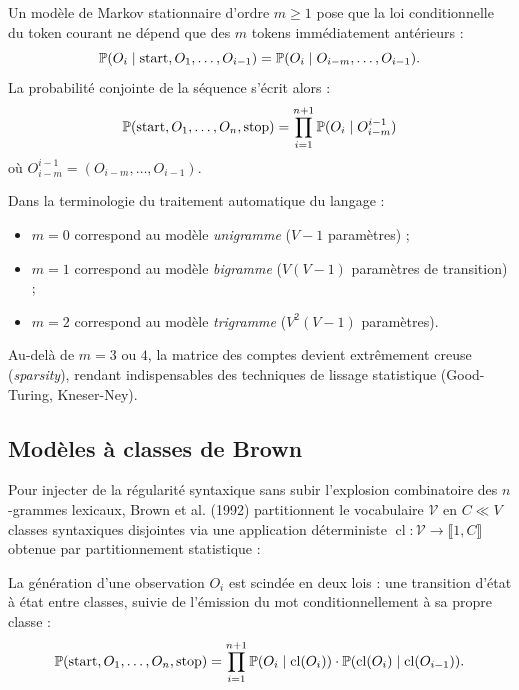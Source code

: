 \begin{definition}
    Un modèle de Markov stationnaire d'ordre $m \geqslant 1$ pose que la loi conditionnelle du token courant ne dépend que des $m$ tokens immédiatement antérieurs :
    \begin{equation}
        \mathbb{P}(O_i \mid \operatorname{start}, O_1, \dots, O_{i-1}) = \mathbb{P}(O_i \mid O_{i-m}, \dots, O_{i-1}).
    \end{equation}
    La probabilité conjointe de la séquence s'écrit alors :
    \begin{equation}
        \mathbb{P}(\operatorname{start}, O_1, \dots, O_n, \operatorname{stop}) = \prod_{i=1}^{n+1} \mathbb{P}(O_i \mid O_{i-m}^{i-1})
    \end{equation}
    où $O_{i-m}^{i-1} = (O_{i-m}, \dots, O_{i-1})$.
\end{definition}

\begin{remark}
    Dans la terminologie du traitement automatique du langage :
    \begin{itemize}
        \item $m = 0$ correspond au modèle \emph{unigramme} ($V-1$ paramètres) ;
        \item $m = 1$ correspond au modèle \emph{bigramme} ($V(V-1)$ paramètres de transition) ;
        \item $m = 2$ correspond au modèle \emph{trigramme} ($V^2(V-1)$ paramètres).
    \end{itemize}
    Au-delà de $m = 3$ ou $4$, la matrice des comptes devient extrêmement creuse (\emph{sparsity}), rendant indispensables des techniques de lissage statistique (Good-Turing, Kneser-Ney).
\end{remark}

\subsection{Modèles à classes de Brown}

Pour injecter de la régularité syntaxique sans subir l'explosion combinatoire des $n$-grammes lexicaux, Brown et al. (1992) partitionnent le vocabulaire $\mathcal{V}$ en $C \ll V$ classes syntaxiques disjointes via une application déterministe $\operatorname{cl} : \mathcal{V} \to \llbracket 1, C \rrbracket$ obtenue par partitionnement statistique :

\begin{definition}
    La génération d'une observation $O_i$ est scindée en deux lois : une transition d'état à état entre classes, suivie de l'émission du mot conditionnellement à sa propre classe :
    \begin{equation}
        \mathbb{P}(\operatorname{start}, O_1, \dots, O_n, \operatorname{stop}) = \prod_{i=1}^{n+1} \mathbb{P}(O_i \mid \operatorname{cl}(O_i)) \cdot \mathbb{P}(\operatorname{cl}(O_i) \mid \operatorname{cl}(O_{i-1})).
    \end{equation}
\end{definition}

